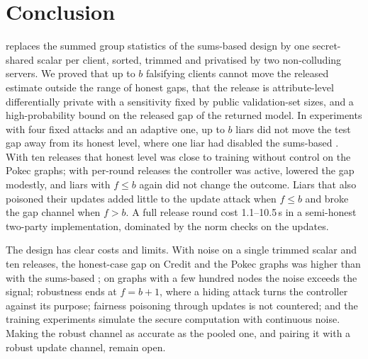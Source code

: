 \section{Conclusion}\label{sec:conclusion}

\rt{} replaces the summed group statistics of the sums-based \clamp{} design by one secret-shared scalar per client, sorted, trimmed and privatised by two non-colluding servers. We proved that up to $b$ falsifying clients cannot move the released estimate outside the range of honest gaps, that the release is attribute-level differentially private with a sensitivity fixed by public validation-set sizes, and a high-probability bound on the released gap of the returned model. In experiments with four fixed attacks and an adaptive one, up to $b$ liars did not move the test gap away from its honest level, where one liar had disabled the sums-based \clamp{}. With ten releases that honest level was close to training without control on the Pokec graphs; with per-round releases the controller was active, lowered the gap modestly, and liars with $f\le b$ again did not change the outcome. Liars that also poisoned their updates added little to the update attack when $f\le b$ and broke the gap channel when $f>b$. A full release round cost 1.1--10.5\,s in a semi-honest two-party implementation, dominated by the norm checks on the updates.

The design has clear costs and limits. With noise on a single trimmed scalar and ten releases, the honest-case gap on Credit and the Pokec graphs was higher than with the sums-based \clamp{}; on graphs with a few hundred nodes the noise exceeds the signal; robustness ends at $f=b+1$, where a hiding attack turns the controller against its purpose; fairness poisoning through updates is not countered; and the training experiments simulate the secure computation with continuous noise. Making the robust channel as accurate as the pooled one, and pairing it with a robust update channel, remain open.
